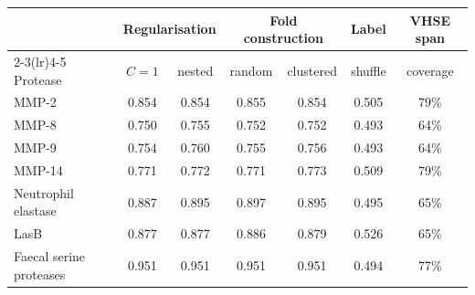 \begin{tabular}{@{}lcccccc@{}}\toprule
 & \multicolumn{2}{c}{Regularisation} & \multicolumn{2}{c}{Fold construction} & Label & VHSE span \\
\cmidrule(lr){2-3}\cmidrule(lr){4-5}
Protease & $C=1$ & nested & random & clustered & shuffle & coverage \\\midrule
MMP-2 & 0.854 & 0.854 & 0.855 & 0.854 & 0.505 & 79\% \\
MMP-8 & 0.750 & 0.755 & 0.752 & 0.752 & 0.493 & 64\% \\
MMP-9 & 0.754 & 0.760 & 0.755 & 0.756 & 0.493 & 64\% \\
MMP-14 & 0.771 & 0.772 & 0.771 & 0.773 & 0.509 & 79\% \\
Neutrophil elastase & 0.887 & 0.895 & 0.897 & 0.895 & 0.495 & 65\% \\
LasB & 0.877 & 0.877 & 0.886 & 0.879 & 0.526 & 65\% \\
Faecal serine proteases & 0.951 & 0.951 & 0.951 & 0.951 & 0.494 & 77\% \\
\bottomrule\end{tabular}
